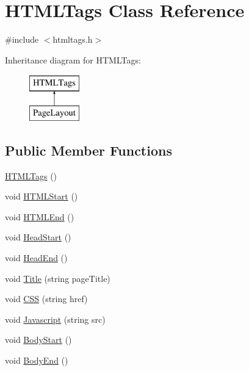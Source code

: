 \hypertarget{classHTMLTags}{\section{H\-T\-M\-L\-Tags Class Reference}
\label{classHTMLTags}
}


{\ttfamily \#include $<$htmltags.\-h$>$}

Inheritance diagram for H\-T\-M\-L\-Tags\-:\begin{figure}[H]
\begin{center}
\leavevmode
\includegraphics[height=2.000000cm]{classHTMLTags}
\end{center}
\end{figure}
\subsection*{Public Member Functions}
\begin{DoxyCompactItemize}
\item 
\hyperlink{classHTMLTags_a4f0bb4f538b87033b574ff05798eb60b}{H\-T\-M\-L\-Tags} ()
\item 
void \hyperlink{classHTMLTags_a567551cd701d2836d4240b2917b5e13f}{H\-T\-M\-L\-Start} ()
\item 
void \hyperlink{classHTMLTags_a6553c3d01ee194a1d157e6341333dee3}{H\-T\-M\-L\-End} ()
\item 
void \hyperlink{classHTMLTags_af2b01cc08884af52e0b291d07035062e}{Head\-Start} ()
\item 
void \hyperlink{classHTMLTags_afdc779e46fac16cc79e4f0e87f621254}{Head\-End} ()
\item 
void \hyperlink{classHTMLTags_a5128d6f1c6be5ac1689047fc9d0d159f}{Title} (string page\-Title)
\item 
void \hyperlink{classHTMLTags_a4e9e18580cc7f2b82c82e4f81e39be50}{C\-S\-S} (string href)
\item 
void \hyperlink{classHTMLTags_aea041d720f12a210615c95350774e6aa}{Javascript} (string src)
\item 
void \hyperlink{classHTMLTags_af1fb7b90b9ebb83177da18aba1ef86a9}{Body\-Start} ()
\item 
void \hyperlink{classHTMLTags_a7cae36bd3a0e6f35e89494e5cda64971}{Body\-End} ()
\end{DoxyCompactItemize}


